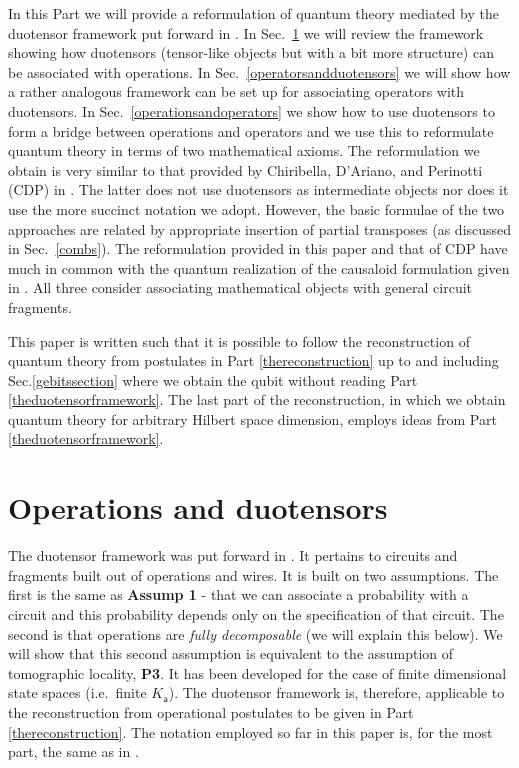 \documentclass[10pt]{article}
\begin{document}
In this Part we will provide a reformulation of quantum theory mediated by the duotensor framework put forward in \cite{hardy2010formalism}.   In Sec.\ \ref{operationsandduotensors} we will review the framework showing how duotensors (tensor-like objects but with a bit more structure) can be associated with operations.  In Sec.\ \ref{operatorsandduotensors} we will show how a rather analogous framework can be set up for associating operators with duotensors.  In Sec.\ \ref{operationsandoperators} we show how to use duotensors to form a bridge between operations and operators and we use this to reformulate quantum theory in terms of two mathematical axioms.  The reformulation we obtain is very similar to that provided by Chiribella, D'Ariano, and Perinotti (CDP) in \cite{chiribella2009theoretical}.  The latter does not use duotensors as intermediate objects nor does it use the more succinct notation we adopt. However, the basic formulae of the two approaches are related by appropriate insertion of partial transposes (as discussed in Sec.\ \ref{combs}).  The reformulation provided in this paper and that of CDP have much in common with the quantum realization of the causaloid formulation given in \cite{hardy2005probability, hardy2007towards}.  All three consider associating mathematical objects with general circuit fragments.

This paper is written such that it is possible to follow the reconstruction of quantum theory from postulates in Part \ref{thereconstruction} up to  and including Sec.\ref{gebitssection} where we obtain the qubit without reading  Part \ref{theduotensorframework}.  The last part of the reconstruction, in which we obtain quantum theory for arbitrary Hilbert space dimension, employs ideas from Part \ref{theduotensorframework}.

\section{Operations and duotensors}\label{operationsandduotensors}


The duotensor framework was put forward in \cite{hardy2010formalism}.  It pertains to circuits and fragments built out of operations and wires.  It is built on two assumptions.  The first is the same as {\bf Assump 1} - that we can associate a probability with a circuit and this probability depends only on the specification of that circuit.  The second is that operations are {\it fully decomposable} (we will explain this below).  We will show that this second assumption is equivalent to the assumption of tomographic locality, {\bf P3}.  It has been developed for the case of finite dimensional state spaces (i.e.\ finite $K_\mathsf{a}$).  The duotensor framework is, therefore, applicable to the reconstruction from operational postulates to be given in Part \ref{thereconstruction}.   The notation employed so far in this paper is, for the most part,  the same as in \cite{hardy2010formalism}.
\end{document}
